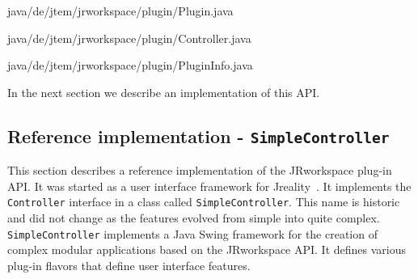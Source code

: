  {java/de/jtem/jrworkspace/plugin/Plugin.java}

 {java/de/jtem/jrworkspace/plugin/Controller.java}

 {java/de/jtem/jrworkspace/plugin/PluginInfo.java}

In the next section we describe an implementation of this API.

\subsection{Reference implementation - {\tt SimpleController}}
This section describes a reference implementation of the {\sc JRworkspace} plug-in API.
It was started as a user interface framework for {\sc Jreality}~\cite{JrealityWebsite}. It implements
the {\tt Controller} interface in a class called {\tt SimpleController}. This name is historic
and did not change as the features evolved from simple into quite complex.
{\tt SimpleController} implements a {\sc Java Swing\TReg} framework for the creation of complex
modular applications based on the {\sc JRworkspace} API. It defines various plug-in flavors
that define user interface features.



